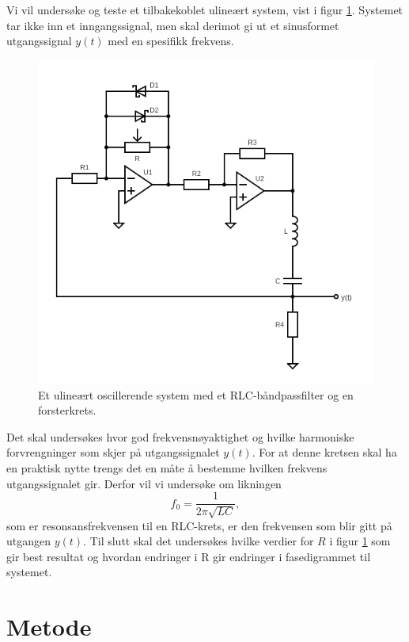 \documentclass[a4paper,11pt,norsk]{article}
\begin{document}
Vi vil undersøke og teste et tilbakekoblet ulineært system, vist i figur \ref{fig:hovedkrets}. Systemet tar ikke inn et inngangssignal, men skal derimot gi ut et sinusformet utgangssignal $y(t)$ med en spesifikk frekvens.

\begin{figure}[H]
  \centering
  \includegraphics[scale=0.7]{D1/Images/withoutvalues.png}
  \caption{Et ulineært oscillerende system med et RLC-båndpassfilter og en forsterkrets.}
  \label{fig:hovedkrets}
\end{figure}

Det skal undersøkes hvor god frekvensnøyaktighet og hvilke harmoniske forvrengninger som skjer på utgangssignalet $y(t)$. For at denne kretsen skal ha en praktisk nytte trengs det en måte å bestemme hvilken frekvens utgangssignalet gir. Derfor vil vi undersøke om likningen 
\begin{equation}
    f_0 = \frac{1}{2\pi\sqrt{LC}},
    \label{eq:senterfrek}
\end{equation}
som er resonsansfrekvensen til en RLC-krets, er den frekvensen som blir gitt på utgangen $y(t)$. Til slutt skal det undersøkes hvilke verdier for $R$ i figur \ref{fig:hovedkrets} som gir best resultat og hvordan endringer i R gir endringer i fasedigrammet til systemet. 

\section{Metode}
\label{sec:metode}
\end{document}
